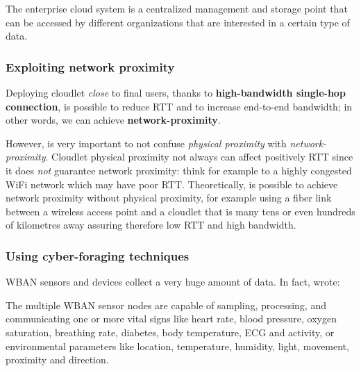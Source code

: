 \documentclass[sigchi]{acmart}
\begin{document}
\vspace{0.3cm}

\begin{quoting}[font=itshape, begintext={``}, endtext={''\cite[par.~4.1]{MSAReport}}] 
The enterprise cloud system is a centralized management and storage point that can be accessed by different organizations that are interested in a certain type of data. 
\end{quoting}

\vspace{0.3cm}

\subsubsection{Exploiting network proximity}

Deploying cloudlet \textit{close} to final users, thanks to \textbf{high-bandwidth single-hop connection}, is possible to reduce RTT and to increase end-to-end bandwidth; in other words, we can achieve \textbf{network-proximity}.\citep{TheSeminalRoleEdgeNativeApplications}

However, is very important to not confuse \textit{physical proximity} with \textit{network-proximity}. Cloudlet physical proximity not always can affect positively RTT since it does \textit{not} guarantee network proximity: think for example to a highly congested WiFi network which may have poor RTT. Theoretically, is possible to achieve network proximity without physical proximity, for example using a fiber link between a wireless access point and a cloudlet that is many tens or even hundreds of kilometres away assuring therefore low RTT and high bandwidth.\cite{TheSeminalRoleEdgeNativeApplications}

\subsubsection{Using cyber-foraging techniques}

WBAN sensors and devices collect a very huge amount of data. In fact, \citet{MSAReport} wrote:

\vspace{0.3cm}

\begin{quoting}[font=itshape, begintext={``}, endtext={''\cite[par.~1.1]{MSAReport}}]
The multiple WBAN sensor nodes are capable of sampling, processing, and communicating one or more vital signs like heart rate, blood pressure, oxygen saturation, breathing rate, diabetes, body temperature, ECG and activity, or environmental parameters like location, temperature, humidity, light, movement, proximity and direction. 
\end{quoting}
\end{document}
